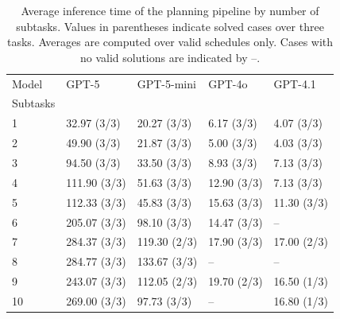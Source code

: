 \begin{table}[htbp]
\centering
\caption[Average inference time of the planning pipeline by number of subtasks.]
{Average inference time of the planning pipeline by number of subtasks. Values in parentheses indicate solved cases over three tasks.
Averages are computed over valid schedules only. Cases with no valid solutions are indicated by --.}
\label{tab:avg_inference_time_by_subtasks}
\centering
\begin{tabular}{lllll}
\toprule
Model & GPT-5 & GPT-5-mini & GPT-4o & GPT-4.1 \\
Subtasks &  &  &  &  \\
\midrule
1 & 32.97 (3/3) & 20.27 (3/3) & 6.17 (3/3) & 4.07 (3/3) \\
2 & 49.90 (3/3) & 21.87 (3/3) & 5.00 (3/3) & 4.03 (3/3) \\
3 & 94.50 (3/3) & 33.50 (3/3) & 8.93 (3/3) & 7.13 (3/3) \\
4 & 111.90 (3/3) & 51.63 (3/3) & 12.90 (3/3) & 7.13 (3/3) \\
5 & 112.33 (3/3) & 45.83 (3/3) & 15.63 (3/3) & 11.30 (3/3) \\
6 & 205.07 (3/3) & 98.10 (3/3) & 14.47 (3/3) & -- \\
7 & 284.37 (3/3) & 119.30 (2/3) & 17.90 (3/3) & 17.00 (2/3) \\
8 & 284.77 (3/3) & 133.67 (3/3) & --  & -- \\
9 & 243.07 (3/3) & 112.05 (2/3) & 19.70 (2/3) & 16.50 (1/3) \\
10 & 269.00 (3/3) & 97.73 (3/3) & -- & 16.80 (1/3) \\
\bottomrule
\end{tabular}

\end{table}
